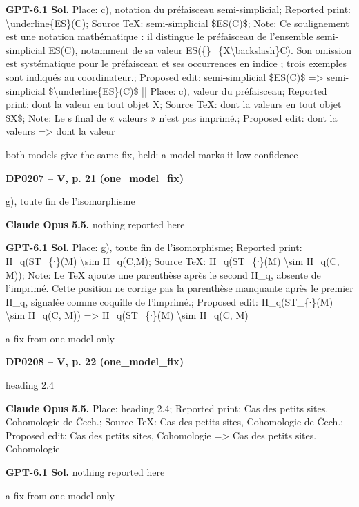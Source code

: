 \textbf{GPT-6.1 Sol.} Place: c), notation du préfaisceau semi-simplicial; Reported print: \textbackslash{}underline\{ES\}(C); Source TeX: semi-simplicial \$ES(C)\$; Note: Ce soulignement est une notation mathématique : il distingue le préfaisceau de l'ensemble semi-simplicial ES(C), notamment de sa valeur ES(\{\}\_\{X\textbackslash{}backslash\}C). Son omission est systématique pour le préfaisceau et ses occurrences en indice ; trois exemples sont indiqués au coordinateur.; Proposed edit: semi-simplicial \$ES(C)\$ =\allowbreak > semi-simplicial \$\textbackslash{}underline\{ES\}(C)\$ || Place: c), valeur du préfaisceau; Reported print: dont la valeur en tout objet X; Source TeX: dont la valeurs en tout objet \$X\$; Note: Le s final de « valeurs » n'est pas imprimé.; Proposed edit: dont la valeurs =\allowbreak > dont la valeur\par
both models give the same fix, held: a model marks it low confidence\par
\par\noindent\hypertarget{DP0207}{}\textbf{DP0207 -- V, p. 21 (one\_model\_fix)}\par
g), toute fin de l'isomorphisme\par
\textbf{Claude Opus 5.5.} nothing reported here\par
\textbf{GPT-6.1 Sol.} Place: g), toute fin de l'isomorphisme; Reported print: H\_q(ST\_\{∙\}(M) \textbackslash{}sim H\_q(C,M); Source TeX: H\_q(ST\_\{∙\}(M) \textbackslash{}sim H\_q(C, M)); Note: Le TeX ajoute une parenthèse après le second H\_q, absente de l'imprimé. Cette position ne corrige pas la parenthèse manquante après le premier H\_q, signalée comme coquille de l'imprimé.; Proposed edit: H\_q(ST\_\{∙\}(M) \textbackslash{}sim H\_q(C, M)) =\allowbreak > H\_q(ST\_\{∙\}(M) \textbackslash{}sim H\_q(C, M)\par
a fix from one model only\par
\par\noindent\hypertarget{DP0208}{}\textbf{DP0208 -- V, p. 22 (one\_model\_fix)}\par
heading 2.4\par
\textbf{Claude Opus 5.5.} Place: heading 2.4; Reported print: Cas des petits sites. Cohomologie de Čech.; Source TeX: Cas des petits sites, Cohomologie de Čech.; Proposed edit: Cas des petits sites, Cohomologie =\allowbreak > Cas des petits sites. Cohomologie\par
\textbf{GPT-6.1 Sol.} nothing reported here\par
a fix from one model only\par
